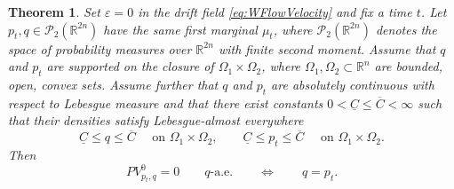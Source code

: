 \documentclass[10pt,a4paper]{amsart}
\newtheorem{theorem}{Theorem}
\newcommand{\R}{\mathbb{R}}
\begin{document}
\begin{theorem}
\label{thm:ProjectedEquilibriumW2}
Set $\varepsilon = 0$ in the drift field \eqref{eq:WFlowVelocity} and fix a time $t$. Let $p_t,q\in\mathcal P_2(\R^{2n})$ have the same first marginal $\mu_t$, where $\mathcal{P}_2(\R^{2n})$ denotes the space of probability measures over $\R^{2n}$ with finite second moment. 
Assume that $q$ and $p_t$ are supported on the closure of $\Omega_1\times\Omega_2$, where $\Omega_1, \Omega_2 \subset \R^{n}$ are bounded, open, convex sets. Assume further that $q$ and $p_t$ are absolutely continuous with respect to Lebesgue measure and that there exist constants $0<\underline{C}\le \overline{C}<\infty$ such that their densities satisfy Lebesgue-almost everywhere
\begin{equation}\label{eq:BoundedDensities}
    \underline{C}\le q\le \overline{C} \quad\text{ on }\Omega_1\times\Omega_2, \qquad \underline{C}\le p_t\le \overline{C} \quad\text{ on }\Omega_1\times\Omega_2.
\end{equation}
Then
\begin{equation}
\label{eq:ProjectedEquilibriumW2}
    PV_{p_t,q}^{0}=0
    \qquad q\text{-a.e.}
    \qquad\Longleftrightarrow\qquad
    q=p_t.
\end{equation}
\end{theorem}
\end{document}
